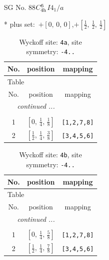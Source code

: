 \documentclass[fleqn,8pt]{jsarticle}
\begin{document}
\setcounter{MaxMatrixCols}{32}

\renewcommand{\tablename}{Table~}
\renewcommand{\figurename}{Figure~}
\begin{center}
\LARGE
SG No. 88\quad$C_{\rm 4h}^{6}$\quad$I4_1/a$\quad[ tetragonal ]
\end{center}
* plus set:\,\,\,$+\left[ 0,\, 0,\, 0 \right]$,\quad $+\left[ \frac{1}{2},\, \frac{1}{2},\, \frac{1}{2} \right]$
\renewcommand{\arraystretch}{1.2}
\begin{longtable}{ccc}
\caption{Wyckoff site: {\tt 4a}, site symmetry: {\tt -4..}}
 \\
 \hline \hline
No. & position & mapping \\ \hline \endfirsthead

\multicolumn{2}{l}{\tablename\ \thetable{}} \\
 \hline \hline
No. & position & mapping \\ \hline \endhead

 \hline \hline
\multicolumn{2}{r}{\footnotesize\it continued ...} \\ \endfoot

 \hline \hline
\multicolumn{2}{r}{} \\ \endlastfoot

1 & $\left[ 0,\, \frac{1}{4},\, \frac{1}{8} \right]$ & {\tt [1,2,7,8]} \\ \hline
2 & $\left[ \frac{1}{2},\, \frac{1}{4},\, \frac{3}{8} \right]$ & {\tt [3,4,5,6]} \\
\end{longtable}
\renewcommand{\arraystretch}{1.2}
\begin{longtable}{ccc}
\caption{Wyckoff site: {\tt 4b}, site symmetry: {\tt -4..}}
 \\
 \hline \hline
No. & position & mapping \\ \hline \endfirsthead

\multicolumn{2}{l}{\tablename\ \thetable{}} \\
 \hline \hline
No. & position & mapping \\ \hline \endhead

 \hline \hline
\multicolumn{2}{r}{\footnotesize\it continued ...} \\ \endfoot

 \hline \hline
\multicolumn{2}{r}{} \\ \endlastfoot

1 & $\left[ 0,\, \frac{1}{4},\, \frac{5}{8} \right]$ & {\tt [1,2,7,8]} \\ \hline
2 & $\left[ \frac{1}{2},\, \frac{1}{4},\, \frac{7}{8} \right]$ & {\tt [3,4,5,6]} \\
\end{longtable}
\end{document}

